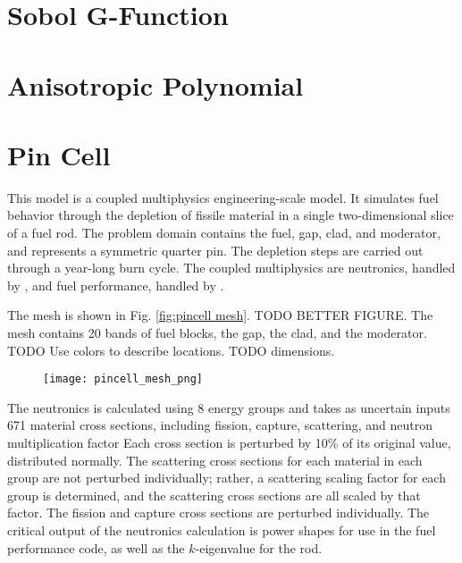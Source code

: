 \section{Sobol G-Function}\label{mod:gfunc}

\section{Anisotropic Polynomial}\label{mod:aniso}

\section{Pin Cell}\label{mod:pincell}
This model is a coupled multiphysics engineering-scale model.  It simulates fuel behavior through the depletion of fissile material
in a single two-dimensional slice of a fuel rod.  The problem domain contains the fuel, gap, clad, and
moderator, and represents a symmetric quarter pin.  The depletion steps are carried out through a year-long
burn cycle.
The coupled multiphysics are neutronics, handled by \rattlesnake{}, and fuel performance, handled by
\bison{}.  

The mesh is shown in Fig. \ref{fig:pincell mesh}.  TODO BETTER FIGURE.  The mesh contains 20 bands of fuel
blocks, the gap, the clad, and the moderator.  TODO Use colors to describe locations.  TODO dimensions.
\begin{figure}[htb]
  \centering
  \texttt{[image: pincell\_mesh\_png]}
\end{figure}

The neutronics is calculated using 8 energy groups and takes as uncertain inputs 671 material cross
sections, including fission, capture, scattering, and neutron multiplication factor  Each cross section is
perturbed by 10\% of its original value, distributed normally.  The scattering cross
sections for each material in each group are not perturbed individually; rather, a scattering scaling factor
for each group is determined, and the scattering cross sections are all scaled by that factor.  The fission
and capture cross sections are perturbed individually.  The critical output of the neutronics calculation is
power shapes for use in the fuel performance code, as well as the $k$-eigenvalue for the rod.

